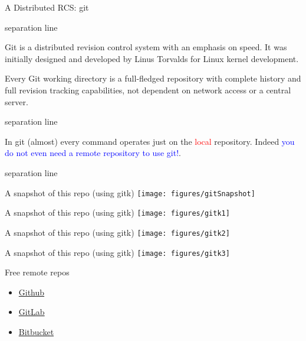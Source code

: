 \documentclass[hyperref={colorlinks}]{beamer}
\newcommand{\titleline}[1][0.025cm]{%
\begin{beamercolorbox}[wd=\paperwidth,ht=#1,center]{separation line}%
\end{beamercolorbox}%
}
\begin{document}
\begin{frame}{A Distributed RCS: git}
\titleline
{%
\small
\RaggedRight
Git is a distributed revision control system with an emphasis on speed.
It was initially designed and developed by Linus Torvalds for Linux kernel development. 
\smallskip

\alert{Every Git working directory is a full-fledged repository
with complete history and full revision tracking capabilities, not dependent on network access or a central server.}
}%
\titleline

In git (almost) every command operates just on the  \textcolor{red}{local}
repository. Indeed \textcolor{blue}{you do not even need a remote repository to use git!}.
\titleline
\end{frame}

\begin{frame}{A snapshot of this repo (using gitk)}
  \texttt{[image: figures/gitSnapshot]}
\end{frame}

\begin{frame}{A snapshot of this repo (using gitk)}
  \texttt{[image: figures/gitk1]}
\end{frame}
\begin{frame}{A snapshot of this repo (using gitk)}
  \texttt{[image: figures/gitk2]}
\end{frame}
\begin{frame}{A snapshot of this repo (using gitk)}
  \texttt{[image: figures/gitk3]}
\end{frame}

\begin{frame}{Free remote repos}
\begin{itemize}
    \item \href{https://github.com/}{Github}
    \item \href{https://gitlab.com/}{GitLab}
    \item \href{https://bitbucket.org/}{Bitbucket}
\end{itemize}
\end{frame}
\end{document}
